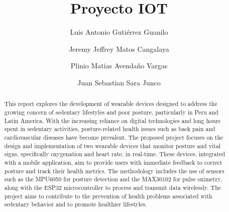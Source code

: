 \documentclass[manuscript,screen,review]{acmart}
\begin{document}
\title{Proyecto IOT}


\author{Luis Antonio Guti\'errez Guanilo}

\author{Jeremy Jeffrey Matos Cangalaya}

\author{Plinio Matias Avenda\~no Vargas}

\author{Juan Sebastian Sara Junco}

\renewcommand{\shortauthors}{Guti\'errez et al.}

\begin{abstract}
This report explores the development of wearable devices designed to address the growing concern of sedentary lifestyles and poor posture, particularly in Peru and Latin America. With the increasing reliance on digital technologies and long hours spent in sedentary activities, posture-related health issues such as back pain and cardiovascular diseases have become prevalent. The proposed project focuses on the design and implementation of two wearable devices that monitor posture and vital signs, specifically oxygenation and heart rate, in real-time. These devices, integrated with a mobile application, aim to provide users with immediate feedback to correct posture and track their health metrics. The methodology includes the use of sensors such as the MPU6050 for posture detection and the MAX30102 for pulse oximetry, along with the ESP32 microcontroller to process and transmit data wirelessly. The project aims to contribute to the prevention of health problems associated with sedentary behavior and to promote healthier lifestyles.
\end{abstract}
\end{document}
